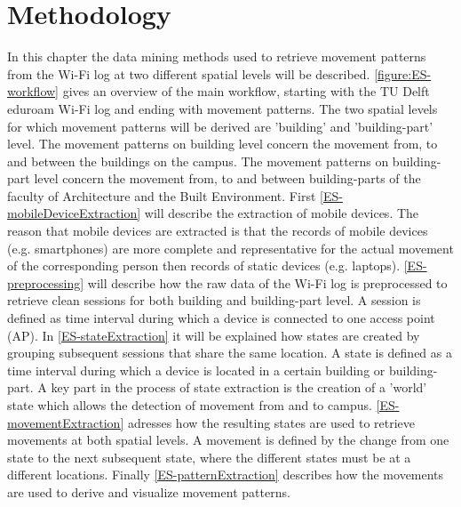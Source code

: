 \section{Methodology}\label{2-methodology}
In this chapter the data mining methods used to retrieve movement patterns from the Wi-Fi log at two different spatial levels will be described. \autoref{figure:ES-workflow} gives an overview of the main workflow, starting with the TU Delft eduroam Wi-Fi log and ending with movement patterns. The two spatial levels for which movement patterns will be derived are 'building' and 'building-part' level. The movement patterns on building level concern the movement from, to and between the buildings on the campus. The movement patterns on building-part level concern the movement from, to and between building-parts of the faculty of Architecture and the Built Environment. First \autoref{ES-mobileDeviceExtraction} will describe the extraction of mobile devices. The reason that mobile devices are extracted is that the records of mobile devices (e.g. smartphones) are more complete and representative for the actual movement of the corresponding person then records of static devices (e.g. laptops). \autoref{ES-preprocessing} will describe how the raw data of the Wi-Fi log is preprocessed to retrieve clean sessions for both building and building-part level. A session is defined as time interval during which a device is connected to one access point (AP). In \autoref{ES-stateExtraction} it will be explained how states are created by grouping subsequent sessions that share the same location. A state is defined as a time interval during which a device is located in a certain building or building-part. A key part in the process of state extraction is the creation of a 'world' state which allows the detection of movement from and to campus. \autoref{ES-movementExtraction} adresses how the resulting states are used to retrieve movements at both spatial levels. A movement is defined by the change from one state to the next subsequent state, where the different states must be at a different locations. Finally \autoref{ES-patternExtraction} describes how the movements are used to derive and visualize movement patterns.
